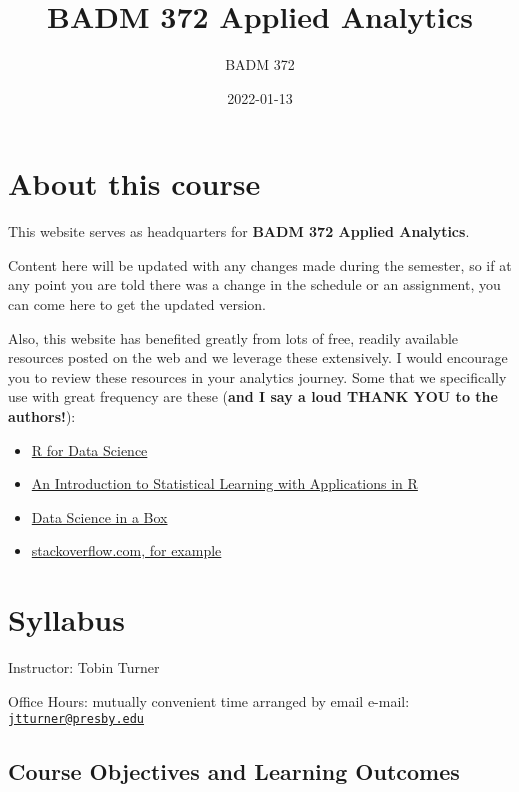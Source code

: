\documentclass[
]{book}
\title{BADM 372 Applied Analytics}
\author{BADM 372}
\date{2022-01-13}
\providecommand{\tightlist}{%
  \setlength{\itemsep}{0pt}\setlength{\parskip}{0pt}}
\theoremstyle{definition}
\theoremstyle{definition}
\theoremstyle{definition}
\theoremstyle{definition}
\theoremstyle{remark}
\begin{document}
\maketitle

{
\setcounter{tocdepth}{1}
\tableofcontents
}
\hypertarget{about-this-course}{%
\chapter{About this course}\label{about-this-course}}

This website serves as headquarters for \textbf{BADM 372 Applied Analytics}.

Content here will be updated with any changes made during the semester, so if at any point you are told there was a change in the schedule or an assignment, you can come here to get the updated version.

Also, this website has benefited greatly from lots of free, readily available resources posted on the web and we leverage these extensively. I would encourage you to review these resources in your analytics journey. Some that we specifically use with great frequency are these (\textbf{and I say a loud THANK YOU to the authors!}):

\begin{itemize}
\tightlist
\item
  \href{https://r4ds.had.co.nz/}{R for Data Science}
\item
  \href{https://trevorhastie.github.io/ISLR/}{An Introduction to Statistical Learning with Applications in R}
\item
  \href{https://datasciencebox.org/}{Data Science in a Box}
\item
  \href{https://stackoverflow.com/questions/4862178/remove-rows-with-all-or-some-nas-missing-values-in-data-frame?rq=1}{stackoverflow.com, for example}
\end{itemize}

\hypertarget{syllabus}{%
\chapter{Syllabus}\label{syllabus}}

Instructor: Tobin Turner

Office Hours: mutually convenient time arranged by email e-mail: \href{mailto:jtturner@presby.edu}{\nolinkurl{jtturner@presby.edu}}

\hypertarget{course-objectives-and-learning-outcomes}{%
\section{Course Objectives and Learning Outcomes}\label{course-objectives-and-learning-outcomes}}
\end{document}

